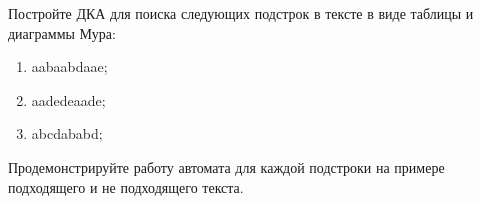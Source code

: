 \question 
Постройте ДКА для поиска следующих подстрок в тексте в виде таблицы и диаграммы Мура:
\begin{enumerate}
\item  aabaabdaae;
\item  aadedeaade;
\item  abcdababd;
\end{enumerate}
Продемонстрируйте работу автомата для каждой подстроки на примере подходящего и не подходящего текста.
